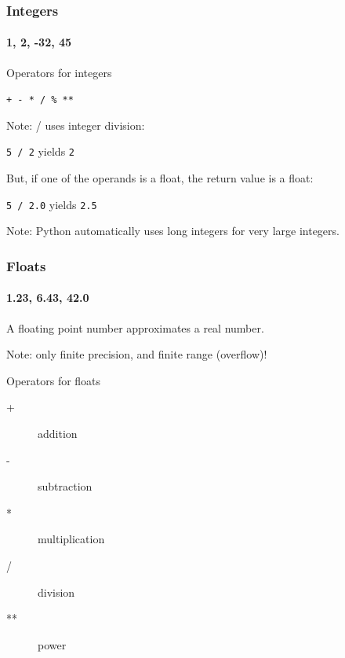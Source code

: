 \begin{frame}\frametitle{Integers}
    \framesubtitle{1, 2, -32, 45}

    Operators for integers

    \texttt{+ - * / \% **}

    \vfill

    Note: / uses integer division:

    \texttt{5 / 2} yields \texttt{2}

    \vfill

    But, if one of the operands is a float, the return value is a float:

    \texttt{5 / 2.0} yields \texttt{2.5}

    \vfill

    Note: Python automatically uses long integers for very large integers.

\end{frame}

\begin{frame}\frametitle{Floats}
    \framesubtitle{1.23, 6.43, 42.0}

    A floating point number approximates a real number.

    Note: only finite precision, and finite range (overflow)!

    Operators for floats

    \begin{description}
        \item[+] addition
        \item[-] subtraction
        \item[*] multiplication
        \item[/] division
        \item[**] power
    \end{description}

\end{frame}


